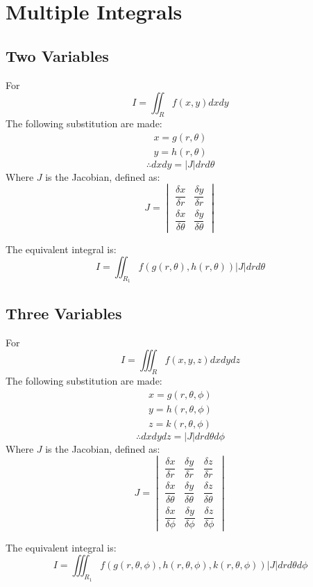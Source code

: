 \large{\chapter{Multiple Integrals}}
\section{Two Variables}
For
\begin{equation}
	I=\iint_R f(x,y) dxdy
\end{equation}
The following substitution are made:
\begin{align}
	x=g(r,\theta)\\
	y=h(r,\theta)
\end{align}
\begin{equation}
	\therefore dx dy=\lvert J \rvert dr d\theta
\end{equation}
Where $J$ is the Jacobian, defined as:
\begin{equation}
	J=\begin{vmatrix}
		\dfrac{\delta x}{\delta r}&\dfrac{\delta y}{\delta r}\\
		\dfrac{\delta x}{\delta \theta}&\dfrac{\delta y}{\delta \theta}
	\end{vmatrix}
\end{equation}

The equivalent integral is:
\begin{equation}
	I=\iint_{R_1} f(g(r,\theta),h(r,\theta))\lvert J \rvert drd\theta
\end{equation}

\section{Three Variables}
For
\begin{equation}
	I=\iiint_R f(x,y,z) dxdydz
\end{equation}
The following substitution are made:
\begin{align}
	x=g(r,\theta,\phi)\\
	y=h(r,\theta,\phi)\\
	z=k(r,\theta,\phi)
\end{align}
\begin{equation}
	\therefore dx dy dz=\lvert J \rvert dr d\theta d\phi
\end{equation}
Where $J$ is the Jacobian, defined as:
\begin{equation}
	J=\begin{vmatrix}
		\dfrac{\delta x}{\delta r}&\dfrac{\delta y}{\delta r}&\dfrac{\delta z}{\delta r}\\
		\dfrac{\delta x}{\delta \theta}&\dfrac{\delta y}{\delta \theta}&\dfrac{\delta z}{\delta \theta}\\
		\dfrac{\delta x}{\delta \phi}&\dfrac{\delta y}{\delta \phi}&\dfrac{\delta z}{\delta \phi}
	\end{vmatrix}
\end{equation}

The equivalent integral is:
\begin{equation}
	I=\iiint_{R_1} f(g(r,\theta,\phi),h(r,\theta,\phi),k(r,\theta,\phi))\lvert J \rvert dr d\theta d\phi
\end{equation}
